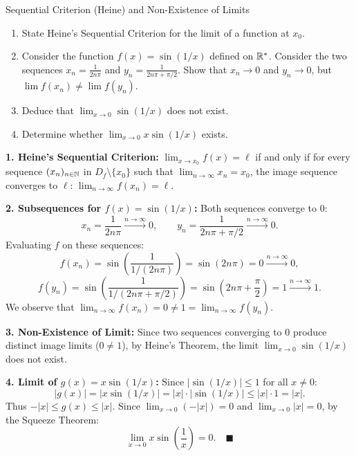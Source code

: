 \begin{exercise}{Sequential Criterion (Heine) and Non-Existence of Limits}
\begin{enumerate}[leftmargin=1.5em,itemsep=2pt]
  \item State Heine's Sequential Criterion for the limit of a function at $x_0$.
  \item Consider the function $f(x) = \sin(1/x)$ defined on $\mathbb{R}^*$.
  Consider the two sequences $x_n = \frac{1}{2n\pi}$ and $y_n = \frac{1}{2n\pi + \pi/2}$.
  Show that $x_n \to 0$ and $y_n \to 0$, but $\lim f(x_n) \ne \lim f(y_n)$.
  \item Deduce that $\lim_{x \to 0} \sin(1/x)$ does not exist.
  \item Determine whether $\lim_{x \to 0} x \sin(1/x)$ exists.
\end{enumerate}
\end{exercise}

\begin{tabletworkspace}[5.0cm]
\end{tabletworkspace}

\begin{solution}
\textbf{1. Heine's Sequential Criterion:}
$\lim_{x \to x_0} f(x) = \ell$ if and only if for every sequence $(x_n)_{n \in \mathbb{N}}$ in $D_f \setminus \{x_0\}$ such that $\lim_{n \to \infty} x_n = x_0$, the image sequence converges to $\ell$: $\lim_{n \to \infty} f(x_n) = \ell$.

\textbf{2. Subsequences for $f(x) = \sin(1/x)$:}
Both sequences converge to 0:
\[
x_n = \frac{1}{2n\pi} \xrightarrow{n \to \infty} 0, \qquad y_n = \frac{1}{2n\pi + \pi/2} \xrightarrow{n \to \infty} 0.
\]
Evaluating $f$ on these sequences:
\[
f(x_n) = \sin\left(\frac{1}{1/(2n\pi)}\right) = \sin(2n\pi) = 0 \xrightarrow{n \to \infty} 0,
\]
\[
f(y_n) = \sin\left(\frac{1}{1/(2n\pi + \pi/2)}\right) = \sin\left(2n\pi + \frac{\pi}{2}\right) = 1 \xrightarrow{n \to \infty} 1.
\]
We observe that $\lim_{n \to \infty} f(x_n) = 0 \ne 1 = \lim_{n \to \infty} f(y_n)$.

\textbf{3. Non-Existence of Limit:}
Since two sequences converging to $0$ produce distinct image limits ($0 \ne 1$), by Heine's Theorem, the limit $\lim_{x \to 0} \sin(1/x)$ does not exist.

\textbf{4. Limit of $g(x) = x \sin(1/x)$:}
Since $|\sin(1/x)| \le 1$ for all $x \ne 0$:
\[
|g(x)| = |x \sin(1/x)| = |x| \cdot |\sin(1/x)| \le |x| \cdot 1 = |x|.
\]
Thus $-|x| \le g(x) \le |x|$.
Since $\lim_{x \to 0} (-|x|) = 0$ and $\lim_{x \to 0} |x| = 0$, by the Squeeze Theorem:
\[
\lim_{x \to 0} x \sin\left(\frac{1}{x}\right) = 0. \quad \blacksquare
\]
\end{solution}

